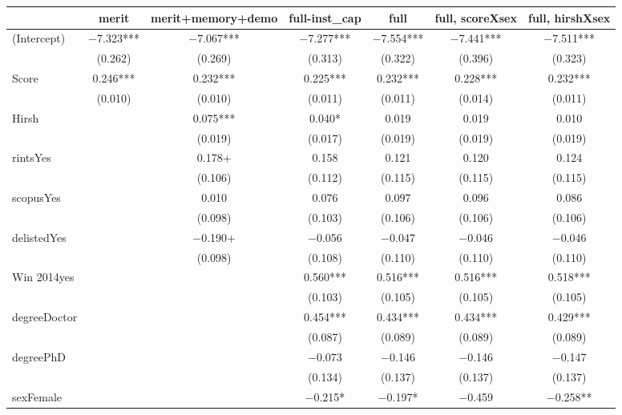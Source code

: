 \begin{table}
\centering
\begin{tabular}[t]{lcccccc}
\toprule
  & merit & merit+memory+demo & full-inst\_cap & full & full, scoreXsex & full, hirshXsex\\
\midrule
(Intercept) & \num{-7.323}*** & \num{-7.067}*** & \num{-7.277}*** & \num{-7.554}*** & \num{-7.441}*** & \num{-7.511}***\\
 & (\num{0.262}) & (\num{0.269}) & (\num{0.313}) & (\num{0.322}) & (\num{0.396}) & (\num{0.323})\\
Score & \num{0.246}*** & \num{0.232}*** & \num{0.225}*** & \num{0.232}*** & \num{0.228}*** & \num{0.232}***\\
 & (\num{0.010}) & (\num{0.010}) & (\num{0.011}) & (\num{0.011}) & (\num{0.014}) & (\num{0.011})\\
Hirsh &  & \num{0.075}*** & \num{0.040}* & \num{0.019} & \num{0.019} & \num{0.010}\\
 &  & (\num{0.019}) & (\num{0.017}) & (\num{0.019}) & (\num{0.019}) & (\num{0.019})\\
rintsYes &  & \num{0.178}+ & \num{0.158} & \num{0.121} & \num{0.120} & \num{0.124}\\
 &  & (\num{0.106}) & (\num{0.112}) & (\num{0.115}) & (\num{0.115}) & (\num{0.115})\\
scopusYes &  & \num{0.010} & \num{0.076} & \num{0.097} & \num{0.096} & \num{0.086}\\
 &  & (\num{0.098}) & (\num{0.103}) & (\num{0.106}) & (\num{0.106}) & (\num{0.106})\\
delistedYes &  & \num{-0.190}+ & \num{-0.056} & \num{-0.047} & \num{-0.046} & \num{-0.046}\\
 &  & (\num{0.098}) & (\num{0.108}) & (\num{0.110}) & (\num{0.110}) & (\num{0.110})\\
Win 2014yes &  &  & \num{0.560}*** & \num{0.516}*** & \num{0.516}*** & \num{0.518}***\\
 &  &  & (\num{0.103}) & (\num{0.105}) & (\num{0.105}) & (\num{0.105})\\
degreeDoctor &  &  & \num{0.454}*** & \num{0.434}*** & \num{0.434}*** & \num{0.429}***\\
 &  &  & (\num{0.087}) & (\num{0.089}) & (\num{0.089}) & (\num{0.089})\\
degreePhD &  &  & \num{-0.073} & \num{-0.146} & \num{-0.146} & \num{-0.147}\\
 &  &  & (\num{0.134}) & (\num{0.137}) & (\num{0.137}) & (\num{0.137})\\
sexFemale &  &  & \num{-0.215}* & \num{-0.197}* & \num{-0.459} & \num{-0.258}**\\

\end{tabular}
\end{table}
